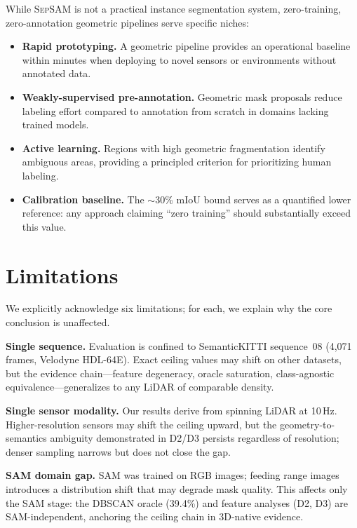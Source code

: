 \documentclass{article}
\begin{document}
While \textsc{SepSAM} is not a practical instance segmentation system,
zero-training, zero-annotation geometric pipelines serve specific niches:

\begin{itemize}
    \item \textbf{Rapid prototyping.} A geometric pipeline provides an operational
    baseline within minutes when deploying to novel sensors or environments without
    annotated data.
    \item \textbf{Weakly-supervised pre-annotation.} Geometric mask proposals
    reduce labeling effort compared to annotation from scratch in domains lacking
    trained models.
    \item \textbf{Active learning.} Regions with high geometric fragmentation
    identify ambiguous areas, providing a principled criterion for prioritizing
    human labeling.
    \item \textbf{Calibration baseline.} The $\sim$30\% mIoU bound serves as a
    quantified lower reference: any approach claiming ``zero training'' should
    substantially exceed this value.
\end{itemize}

\section{Limitations}

We explicitly acknowledge six limitations; for each, we explain why the core
conclusion is unaffected.

\textbf{Single sequence.} Evaluation is confined to SemanticKITTI sequence~08
(4,071 frames, Velodyne HDL-64E). Exact ceiling values may shift on other
datasets, but the evidence chain---feature degeneracy, oracle saturation,
class-agnostic equivalence---generalizes to any LiDAR of comparable density.

\textbf{Single sensor modality.} Our results derive from spinning LiDAR at
10\,Hz. Higher-resolution sensors may shift the ceiling upward, but the
geometry-to-semantics ambiguity demonstrated in D2/D3 persists regardless of
resolution; denser sampling narrows but does not close the gap.

\textbf{SAM domain gap.} SAM was trained on RGB images; feeding range images
introduces a distribution shift that may degrade mask quality. This affects only
the SAM stage: the DBSCAN oracle (39.4\%) and feature analyses (D2, D3) are
SAM-independent, anchoring the ceiling chain in 3D-native evidence.
\end{document}
